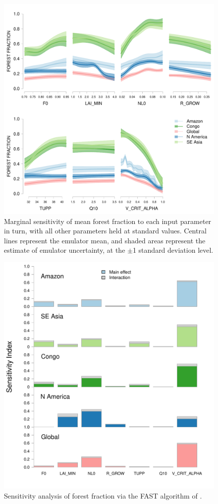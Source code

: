 \documentclass[esd, manuscript]{copernicus}
\begin{document}
\begin{figure}[t]
\includegraphics[width=12cm]{graphics/amaz_oat_sens.pdf}
\caption{Marginal sensitivity of mean forest fraction to each input parameter in turn, with all other parameters held at standard values. Central lines represent the emulator mean, and shaded areas represent the estimate of emulator uncertainty, at the $\pm$1 standard deviation level.}
\label{fig:amaz_oat_sens}
\end{figure}

\begin{figure}[t]
\includegraphics[width=12cm]{graphics/FAST_histograms.pdf}
\caption{Sensitivity analysis of forest fraction via the FAST algorithm of \cite{saltelli1999sensitivity}.}
\label{fig:FAST_histograms}
\end{figure}
\end{document}
